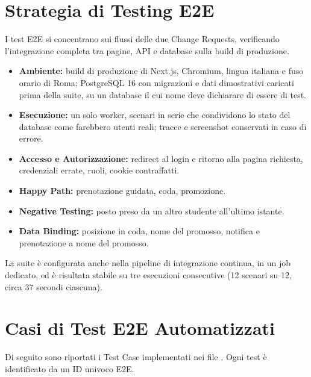 \documentclass[11pt,a4paper,oneside,openany]{book}
\begin{document}
\section{Strategia di Testing E2E}

I test E2E si concentrano sui flussi delle due Change Requests, verificando
l'integrazione completa tra pagine, API e database sulla build di produzione.
\begin{itemize}
  \item \textbf{Ambiente:} build di produzione di Next.js, Chromium,
        lingua italiana e fuso orario di Roma; PostgreSQL 16 con migrazioni e
        dati dimostrativi caricati prima della suite, su un database il cui
        nome deve dichiarare di essere di test.
  \item \textbf{Esecuzione:} un solo worker, scenari in serie che condividono
        lo stato del database come farebbero utenti reali; tracce e
        screenshot conservati in caso di errore.
  \item \textbf{Accesso e Autorizzazione:} redirect al login e ritorno alla
        pagina richiesta, credenziali errate, ruoli, cookie contraffatti.
  \item \textbf{Happy Path:} prenotazione guidata, coda, promozione.
  \item \textbf{Negative Testing:} posto preso da un altro studente
        all'ultimo istante.
  \item \textbf{Data Binding:} posizione in coda, nome del promosso, notifica
        e prenotazione a nome del promosso.
\end{itemize}

La suite è configurata anche nella pipeline di integrazione continua, in un
job dedicato, ed è risultata stabile su tre esecuzioni consecutive (12 scenari
su 12, circa 37 secondi ciascuna).

\section{Casi di Test E2E Automatizzati}

Di seguito sono riportati i Test Case implementati nei file
. Ogni test è identificato da un ID univoco E2E.
\end{document}
